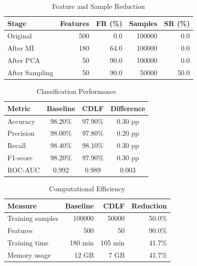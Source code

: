 
\begin{table}[htbp]
\centering
\caption{Feature and Sample Reduction}
\label{tab:feature_sample_reduction}
\scriptsize
\begin{tabular}{|l|r|r|r|r|}
\hline
\textbf{Stage} & \textbf{Features} & \textbf{FR (\%)} & \textbf{Samples} & \textbf{SR (\%)}\\
\hline
Original & 500 & 0.0 & 100000 & 0.0\\
After MI & 180 & 64.0 & 100000 & 0.0\\
After PCA & 50 & 90.0 & 100000 & 0.0\\
After Sampling & 50 & 90.0 & 50000 & 50.0\\
\hline
\end{tabular}
\end{table}

\begin{table}[htbp]
\centering
\caption{Classification Performance}
\label{tab:classification}
\scriptsize
\begin{tabular}{|l|c|c|c|}
\hline
\textbf{Metric} & \textbf{Baseline} & \textbf{CDLF} & \textbf{Difference}\\
\hline
Accuracy & 98.20\% & 97.90\% & 0.30 pp\\
Precision & 98.00\% & 97.80\% & 0.20 pp\\
Recall & 98.40\% & 98.10\% & 0.30 pp\\
F1-score & 98.20\% & 97.90\% & 0.30 pp\\
ROC-AUC & 0.992 & 0.989 & 0.003\\
\hline
\end{tabular}
\end{table}

\begin{table}[htbp]
\centering
\caption{Computational Efficiency}
\label{tab:efficiency}
\scriptsize
\begin{tabular}{|l|r|r|r|}
\hline
\textbf{Measure} & \textbf{Baseline} & \textbf{CDLF} & \textbf{Reduction}\\
\hline
Training samples & 100000 & 50000 & 50.0\%\\
Features & 500 & 50 & 90.0\%\\
Training time & 180 min & 105 min & 41.7\%\\
Memory usage & 12 GB & 7 GB & 41.7\%\\
\hline
\end{tabular}
\end{table}

